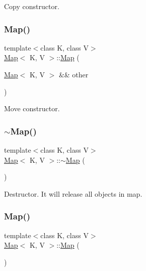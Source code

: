 Copy constructor. \mbox{\label{classMap_adf81c5ca8314af5a2feeffd6a727ac65}} 
\subsubsection{\texorpdfstring{Map()}{Map()}\hspace{0.1cm}{\footnotesize\ttfamily [4/8]}}
{\footnotesize\ttfamily template$<$class K, class V$>$ \\
\hyperlink{classMap}{Map}$<$ K, V $>$\+::\hyperlink{classMap}{Map} (\begin{DoxyParamCaption}\item[{\hyperlink{classMap}{Map}$<$ K, V $>$ \&\&}]{other }\end{DoxyParamCaption})\hspace{0.3cm}{\ttfamily [inline]}}

Move constructor. \mbox{\label{classMap_a6d8939f2cc39bf1f49ac76e32822e96c}} 
\subsubsection{\texorpdfstring{$\sim$\+Map()}{~Map()}\hspace{0.1cm}{\footnotesize\ttfamily [1/2]}}
{\footnotesize\ttfamily template$<$class K, class V$>$ \\
\hyperlink{classMap}{Map}$<$ K, V $>$\+::$\sim$\hyperlink{classMap}{Map} (\begin{DoxyParamCaption}{ }\end{DoxyParamCaption})\hspace{0.3cm}{\ttfamily [inline]}}

Destructor. It will release all objects in map. \mbox{\label{classMap_a06f9fc5d4c9a639994f8d8eb280ae7ed}} 
\subsubsection{\texorpdfstring{Map()}{Map()}\hspace{0.1cm}{\footnotesize\ttfamily [5/8]}}
{\footnotesize\ttfamily template$<$class K, class V$>$ \\
\hyperlink{classMap}{Map}$<$ K, V $>$\+::\hyperlink{classMap}{Map} (\begin{DoxyParamCaption}{ }\end{DoxyParamCaption})\hspace{0.3cm}{\ttfamily [inline]}}

